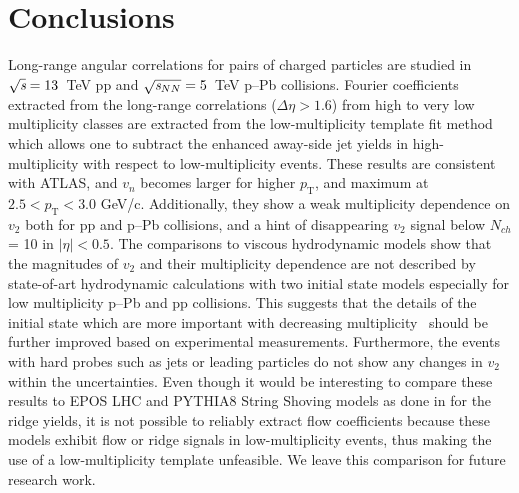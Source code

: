 
\section{Conclusions}
\label{sec:summary}
Long-range angular correlations for pairs of charged particles are studied in ${\sqrt{{\textit s}}}=13$~TeV pp and ${\sqrt{{\textit s_{NN}}}}=5$~TeV p--Pb collisions. Fourier coefficients extracted from the long-range correlations ($\Delta\eta > 1.6$) from high to very low multiplicity classes are extracted from the low-multiplicity template fit method which allows one to subtract the enhanced away-side jet yields in high-multiplicity with respect to low-multiplicity events.
These results are consistent with ATLAS, and $v_n$ becomes larger for higher $p_\mathrm{T}$, and maximum at $2.5<p_\mathrm{T}<3.0$ GeV/c. 
Additionally, they show a weak multiplicity dependence on $v_2$ both for pp and p--Pb collisions, and a hint of disappearing $v_2$ signal below $N_{ch}$ = 10 in $|\eta|<0.5$. 
The comparisons to viscous hydrodynamic models show that the magnitudes of $v_2$ and their multiplicity dependence are not described by state-of-art hydrodynamic calculations with two initial state models especially for low multiplicity p--Pb and pp collisions. This suggests that the details of the initial state which are more important with decreasing multiplicity~\cite{Greif:2017bnr,Moreland:2018gsh} should be further improved based on experimental measurements. 
Furthermore, the events with hard probes such as jets or leading particles do not show any changes in $v_2$ within the uncertainties. 
Even though it would be interesting to compare these results to EPOS LHC and PYTHIA8 String Shoving models as done in \cite{ALICE:2012eyl} for the ridge yields, it is not possible to reliably extract flow coefficients because these models exhibit flow or ridge signals in low-multiplicity events, thus making the use of a low-multiplicity template unfeasible. We leave this comparison for future research work.

